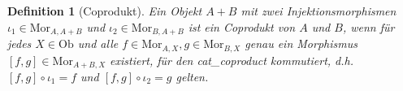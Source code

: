\documentclass[a4paper, bibgerm]{article}
\newcommand\abb{}
\newtheorem{defi}{Definition}
\begin{document}
\begin{defi}[Coprodukt]
  Ein Objekt $A + B$ mit zwei Injektionsmorphismen $\iota_1
  \in \mathrm{Mor}_{A,A + B}$ und $\iota_2 \in \mathrm{Mor}_{B,A +
    B}$ ist ein Coprodukt von $A$ und $B$, wenn für jedes $X \in
  \mathrm{Ob}$ und alle $f \in \mathrm{Mor}_{A,X},g \in
  \mathrm{Mor}_{B,X}$ genau ein Morphismus
  $[f,g] \in \mathrm{Mor}_{A + B,X}$ existiert, für den \abb{cat_coproduct} kommutiert, d.h. 
  $[f,g] \circ \iota_1 = f$ und $[f,g] \circ \iota_2 = g$ gelten.
\end{defi}


\end{document}
